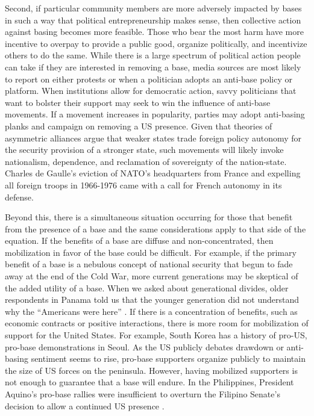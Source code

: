{	Second, if particular community members are more adversely impacted by bases in such a way that political entrepreneurship makes sense, then collective action against basing becomes more feasible. Those who bear the most harm have more incentive to overpay to provide a public good, organize politically, and incentivize others to do the same. While there is a large spectrum of political action people can take if they are interested in removing a base, media sources are most likely to report on either protests or when a politician adopts an anti-base policy or platform. When institutions allow for democratic action, savvy politicians that want to bolster their support may seek to win the influence of anti-base movements. If a movement increases in popularity, parties may adopt anti-basing planks and campaign on removing a US presence. Given that theories of asymmetric alliances argue that weaker states trade foreign policy autonomy for the security provision of a stronger state, such movements will likely invoke nationalism, dependence, and reclamation of sovereignty of the nation-state. Charles de Gaulle's eviction of NATO's headquarters from France and expelling all foreign troops in 1966-1976 came with a call for French autonomy in its defense.
	
	Beyond this, there is a simultaneous situation occurring for those that benefit from the presence of a base and the same considerations apply to that side of the equation. If the benefits of a base are diffuse and non-concentrated, then mobilization in favor of the base could be difficult. For example, if the primary benefit of a base is a nebulous concept of national security that begun to fade away at the end of the Cold War, more current generations may be skeptical of the added utility of a base. When we asked about generational divides, older respondents in Panama told us that the younger generation did not understand why the ``Americans were here'' \cite{journ20180713}. If there is a concentration of benefits, such as economic contracts or positive interactions, there is more room for mobilization of support for the United States. For example, South Korea has a history of pro-US, pro-base demonstrations in Seoul. As the US publicly debates drawdown or anti-basing sentiment seems to rise, pro-base supporters organize publicly to maintain the size of US forces on the peninsula. However, having mobilized supporters is not enough to guarantee that a base will endure. In the Philippines, President Aquino's pro-base rallies were insufficient to overturn the Filipino Senate's decision to allow a continued US presence \cite{Oberdorfer1991,simbulan2009}.
	
}
